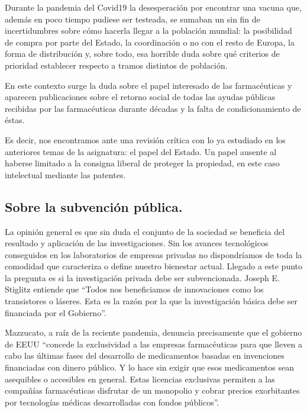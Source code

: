 \documentclass[
]{article}
\begin{document}
Durante la pandemia del Covid19 la desesperación por encontrar una
vacuna que, además en poco tiempo pudiese ser testeada, se sumaban un
sin fin de incertidumbres sobre cómo hacerla llegar a la población
mundial: la posibilidad de compra por parte del Estado, la coordinación
o no con el resto de Europa, la forma de distribución y, sobre todo, esa
horrible duda sobre qué criterios de prioridad establecer respecto a
tramos distintos de población.

En este contexto surge la duda sobre el papel interesado de las
farmacéuticas y aparecen publicaciones sobre el retorno social de todas
las ayudas públicas recibidas por las farmacéuticas durante décadas y la
falta de condicionamiento de éstas.

Es decir, nos encontramos ante una revisión crítica con lo ya estudiado
en los anteriores temas de la asignatura: el papel del Estado. Un papel
ausente al haberse limitado a la consigna liberal de proteger la
propiedad, en este caso intelectual mediante las patentes.

\hypertarget{sobre-la-subvenciuxf3n-puxfablica.}{%
\subsection*{Sobre la subvención
pública.}\label{sobre-la-subvenciuxf3n-puxfablica.}}

La opinión general es que sin duda el conjunto de la sociedad se
beneficia del resultado y aplicación de las investigaciones. Sin los
avances tecnológicos conseguidos en los laboratorios de empresas
privadas no dispondríamos de toda la comodidad que caracteriza o define
nuestro bienestar actual. Llegado a este punto la pregunta es si la
investigación privada debe ser subvencionada. Joseph E. Stiglitz
entiende que ``Todos nos beneficiamos de innovaciones como los
transistores o láseres. Esta es la razón por la que la investigación
básica debe ser financiada por el Gobierno''.

Mazzucato, a raíz de la reciente pandemia, denuncia precisamente que el
gobierno de EEUU ``concede la exclusividad a las empresas farmacéuticas
para que lleven a cabo las últimas fases del desarrollo de medicamentos
basadas en invenciones financiadas con dinero público. Y lo hace sin
exigir que esos medicamentos sean asequibles o accesibles en general.
Estas licencias exclusivas permiten a las compañías farmacéuticas
disfrutar de un monopolio y cobrar precios exorbitantes por tecnologías
médicas desarrolladas con fondos públicos''.
\end{document}
